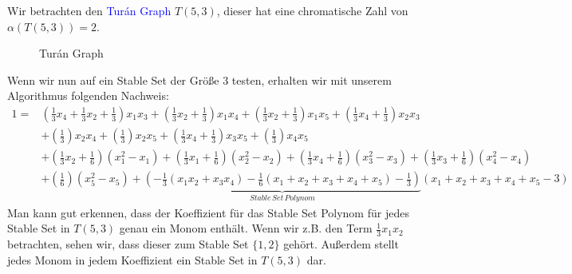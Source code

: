 \begin{example}
Wir betrachten den \textcolor{blue}{Turán Graph} $T(5,3)$, dieser hat eine chromatische Zahl von $\alpha(T(5,3))=2$.

	\begin{figure}[htp]
\begin{center}
\caption[Turán Graph]{Turán Graph}
  \label{Turán Graph}
\end{center}
\end{figure}
\noindent Wenn wir nun auf ein Stable Set der Größe 3 testen, erhalten wir mit unserem Algorithmus folgenden Nachweis:
\begin{align*}
1 = &\left(\frac{1}{3}x_4+\frac{1}{3}x_2+\frac{1}{3}\right)x_1x_3 + \left(\frac{1}{3}x_2+\frac{1}{3}\right)x_1x_4 + \left(\frac{1}{3}x_2+\frac{1}{3}\right)x_1x_5 + \left(\frac{1}{3}x_4+\frac{1}{3}\right)x_2x_3\\ &+ \left(\frac{1}{3}\right)x_2x_4 + \left(\frac{1}{3}\right)x_2x_5 + \left(\frac{1}{3}x_4 +\frac{1}{3}\right)x_3x_5 + \left(\frac{1}{3}\right)x_4x_5 \\ &+ \left(\frac{1}{3}x_2+\frac{1}{6}\right)(x_1^2-x_1) + \left(\frac{1}{3}x_1+\frac{1}{6}\right)(x_2^2-x_2) + \left(\frac{1}{3}x_4+\frac{1}{6}\right)(x_3^2-x_3) + \left(\frac{1}{3}x_3+\frac{1}{6}\right)(x_4^2-x_4) \\ &+ \left(\frac{1}{6}\right)(x_5^2-x_5) + \underbrace{\left(-\frac{1}{3}(x_1x_2 + x_3x_4)-\frac{1}{6}(x_1+x_2+x_3+x_4+x_5)-\frac{1}{3}\right)}_{Stable \, Set \, Polynom} (x_1+x_2+x_3+x_4+x_5-3)
\end{align*}
Man kann gut erkennen, dass der Koeffizient für das Stable Set Polynom für jedes Stable Set in $T(5,3)$ genau ein Monom enthält. Wenn wir z.B. den Term $\frac{1}{3}x_1x_2$ betrachten, sehen wir, dass dieser zum Stable Set $\{1,2\}$ gehört. Außerdem stellt jedes Monom in jedem Koeffizient ein Stable Set in $T(5,3)$ dar.
\end{example}

